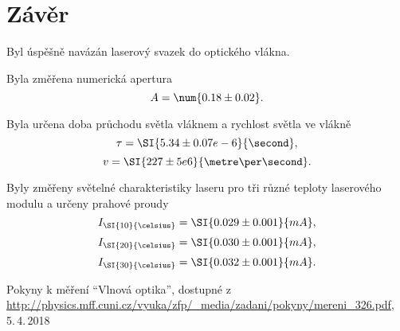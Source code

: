 \documentclass{protokol}
\begin{document}
  \section*{Závěr}

    Byl úspěšně navázán laserový svazek do optického vlákna.

    Byla změřena numerická apertura 
    $$ A = \num{0.18 \pm 0.02}. $$

    Byla určena doba průchodu světla vláknem a rychlost světla ve vlákně
    $$ \tau = \SI{5.34 \pm 0.07 e-6}{\second}, $$
    $$ v = \SI{227 \pm 5 e6}{\metre\per\second}. $$

    Byly změřeny světelné charakteristiky laseru pro tři různé teploty laserového modulu a určeny prahové proudy
    $$ I_{\SI{10}{\celsius}} = \SI{0.029 \pm 0.001}{mA}, $$
    $$ I_{\SI{20}{\celsius}} = \SI{0.030 \pm 0.001}{mA}, $$
    $$ I_{\SI{30}{\celsius}} = \SI{0.032 \pm 0.001}{mA}.  $$
      
  \begin{thebibliography}{}
 
    Pokyny k měření ``Vlnová optika'', dostupné z\\ \url{http://physics.mff.cuni.cz/vyuka/zfp/_media/zadani/pokyny/mereni_326.pdf}, 5.\,4.\,2018
   
  \end{thebibliography}
\end{document}
